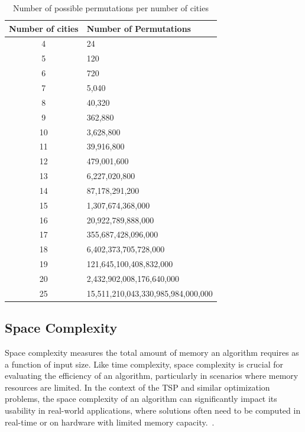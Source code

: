 \begin{table}[h]
	\centering
	\caption{Number of possible permutations per number of cities}
	\begin{tabular}{c l}
		\toprule
		Number of cities & Number of Permutations                \\
		\midrule
		4            & 24                                 \\
		5            & 120                                \\
		6            & 720                                \\
		7            & 5,040                              \\
		8            & 40,320                             \\
		9            & 362,880                            \\
		10           & 3,628,800                          \\
		11           & 39,916,800                         \\
		12           & 479,001,600                        \\
		13           & 6,227,020,800                      \\
		14           & 87,178,291,200                     \\
		15           & 1,307,674,368,000                  \\
		16           & 20,922,789,888,000                 \\
		17           & 355,687,428,096,000                \\
		18           & 6,402,373,705,728,000              \\
		19           & 121,645,100,408,832,000            \\
		20           & 2,432,902,008,176,640,000          \\
		25           & 15,511,210,043,330,985,984,000,000 \\
		\bottomrule
	\end{tabular}
\end{table}

\subsection{Space Complexity}

Space complexity measures the total amount of memory an algorithm requires as a function of input size. Like time complexity, space complexity is crucial for evaluating the efficiency of an algorithm, particularly in scenarios where memory resources are limited. In the context of the \Gls{TSP} and similar optimization problems, the space complexity of an algorithm can significantly impact its usability in real-world applications, where solutions often need to be computed in real-time or on hardware with limited memory capacity.~\cite{HeldKarp1962}.

